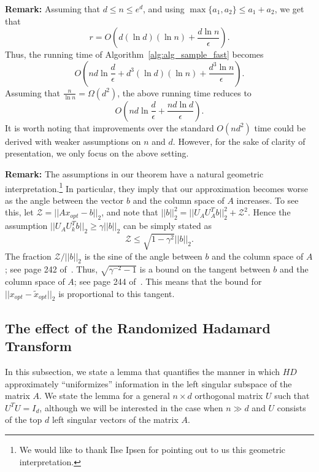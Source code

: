 \documentclass[11pt]{article}
\begin{document}
\noindent \textbf{Remark:} Assuming that $d \leq n \leq e^d$, and using $\max\{a_1,a_2\} \leq a_1 + a_2$, we get that $$r = O\left(d(\ln d)(\ln n) + \frac{d \ln n}{\epsilon}\right).$$ Thus, the running time of Algorithm~\ref{alg:alg_sample_fast} becomes
$$O\left(nd\ln \frac{d}{\epsilon} + d^3 (\ln d)(\ln n) + \frac{d^3 \ln n}{\epsilon}\right).$$
Assuming that $\frac{n}{\ln n} = \Omega(d^2)$, the above running time reduces to $$O\left(nd \ln \frac{d}{\epsilon} + \frac{nd \ln d}{\epsilon}\right).$$ It is worth noting that improvements over the standard $O(nd^2)$ time could be derived with weaker assumptions on $n$ and $d$. However, for the sake of clarity of presentation, we only focus on the above setting.

\noindent \textbf{Remark:}
The assumptions in our theorem have a natural geometric interpretation.\footnote{We would like to thank Ilse Ipsen for pointing out to us this
geometric interpretation.}
In particular, they imply that our approximation becomes worse as the angle
between the vector $b$ and the column space of $A$ increases.
To see this, let $\mathcal{Z} = ||Ax_{opt}-b||_2$, and note that
$||b||_2^2 = ||U_AU^T_A b||_2^2 + \mathcal{Z}^2$.
Hence the assumption
$||U_AU^T_kb||_2 \ge \gamma ||b||_2$ can be simply stated as
$$\mathcal{Z} \le \sqrt{1-\gamma^2}||b||_2.$$
The fraction $\mathcal{Z}/||b||_2$ is the sine of the angle between $b$ and
the column space of $A$; see page 242 of~\cite{GVL96}.
Thus, $\sqrt{\gamma^{-2}-1}$ is a bound on the tangent between $b$ and the
column space of $A$; see page 244 of~\cite{GVL96}.
This means that the bound for $||x_{opt}-\tilde{x}_{opt}||_2$ is
proportional to this tangent.

\subsection{The effect of the Randomized Hadamard Transform}
\label{sxn:review_previous:hadamard}

In this subsection, we state a lemma that quantifies the manner in which $HD$ approximately ``uniformizes'' information in the left singular subspace of the matrix $A$. We state the lemma for a general $n \times d$ orthogonal matrix $U$ such that $U^TU = I_d$, although we will be interested in the case when $n \gg d$ and $U$ consists of the top $d$ left singular vectors of the matrix $A$.
\end{document}
